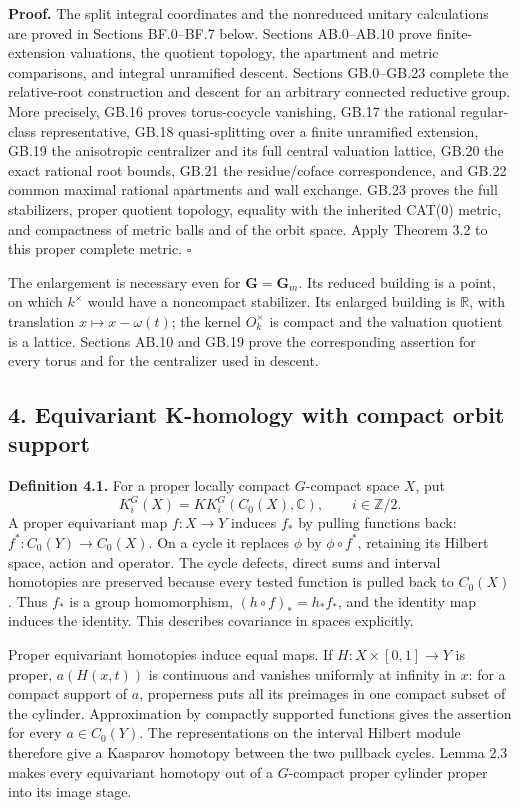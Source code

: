 \documentclass[
  11pt,
]{article}
\begin{document}
\textbf{Proof.} The split integral coordinates and the nonreduced
unitary calculations are proved in Sections BF.0--BF.7 below. Sections
AB.0--AB.10 prove finite-extension valuations, the quotient topology,
the apartment and metric comparisons, and integral unramified descent.
Sections GB.0--GB.23 complete the relative-root construction and descent
for an arbitrary connected reductive group. More precisely, GB.16 proves
torus-cocycle vanishing, GB.17 the rational regular-class
representative, GB.18 quasi-splitting over a finite unramified
extension, GB.19 the anisotropic centralizer and its full central
valuation lattice, GB.20 the exact rational root bounds, GB.21 the
residue/coface correspondence, and GB.22 common maximal rational
apartments and wall exchange. GB.23 proves the full stabilizers, proper
quotient topology, equality with the inherited CAT(0) metric, and
compactness of metric balls and of the orbit space. Apply Theorem 3.2 to
this proper complete metric. \(\square\)

The enlargement is necessary even for \(\mathbf G=\mathbf G_m\). Its
reduced building is a point, on which \(k^\times\) would have a
noncompact stabilizer. Its enlarged building is \(\mathbb R\), with
translation \(x\mapsto x-\omega(t)\); the kernel \(O_k^\times\) is
compact and the valuation quotient is a lattice. Sections AB.10 and
GB.19 prove the corresponding assertion for every torus and for the
centralizer used in descent.

\subsection{4. Equivariant K-homology with compact orbit
support}\label{equivariant-k-homology-with-compact-orbit-support}

\textbf{Definition 4.1.} For a proper locally compact \(G\)-compact
space \(X\), put \[
                   K_i^G(X)=KK_i^G(C_0(X),\mathbb C),\qquad i\in\mathbb Z/2.
 \tag{4.1}
\] A proper equivariant map \(f:X\to Y\) induces \(f_*\) by pulling
functions back: \(f^*:C_0(Y)\to C_0(X)\). On a cycle it replaces
\(\phi\) by \(\phi\circ f^*\), retaining its Hilbert space, action and
operator. The cycle defects, direct sums and interval homotopies are
preserved because every tested function is pulled back to \(C_0(X)\).
Thus \(f_*\) is a group homomorphism, \((h\circ f)_*=h_*f_*\), and the
identity map induces the identity. This describes covariance in spaces
explicitly.

Proper equivariant homotopies induce equal maps. If
\(H:X\times[0,1]\to Y\) is proper, \(a(H(x,t))\) is continuous and
vanishes uniformly at infinity in \(x\): for a compact support of \(a\),
properness puts all its preimages in one compact subset of the cylinder.
Approximation by compactly supported functions gives the assertion for
every \(a\in C_0(Y)\). The representations on the interval Hilbert
module therefore give a Kasparov homotopy between the two pullback
cycles. Lemma 2.3 makes every equivariant homotopy out of a
\(G\)-compact proper cylinder proper into its image stage.
\end{document}
